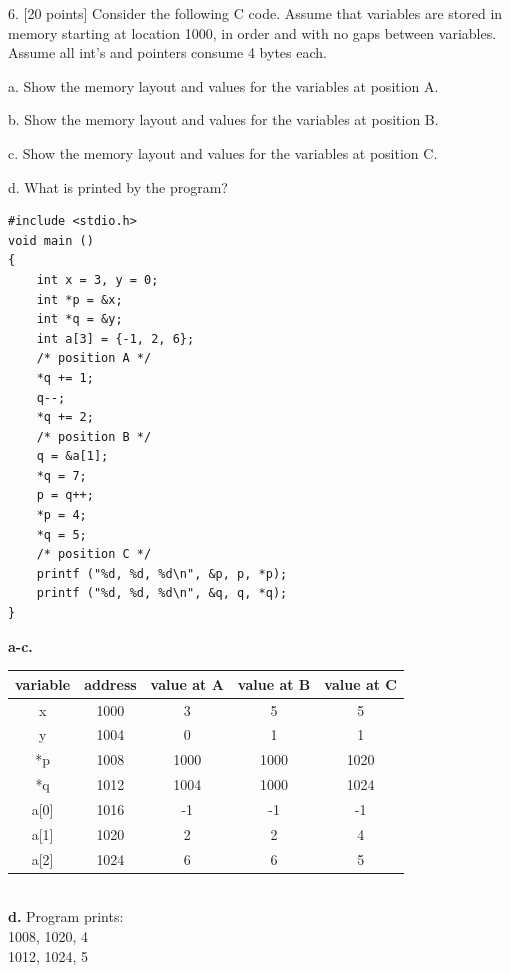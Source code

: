 \documentclass[12pt]{extarticle}
\begin{document}
\pagebreak

6. [20 points] Consider the following C code. Assume that variables are stored in memory starting at location 1000, in order and with no gaps between variables. Assume all int’s and pointers consume 4 bytes each.

a. Show the memory layout and values for the variables at position A.

b. Show the memory layout and values for the variables at position B.

c. Show the memory layout and values for the variables at position C.

d. What is printed by the program?
\begin{verbatim}
#include <stdio.h>
void main ()
{
    int x = 3, y = 0;
    int *p = &x;
    int *q = &y;
    int a[3] = {-1, 2, 6};
    /* position A */
    *q += 1;
    q--;
    *q += 2;
    /* position B */
    q = &a[1];
    *q = 7;
    p = q++;
    *p = 4;
    *q = 5;
    /* position C */
    printf ("%d, %d, %d\n", &p, p, *p);
    printf ("%d, %d, %d\n", &q, q, *q);
}

\end{verbatim}
\textbf{a-c. }\\
\begin{tabular}{|c|c|c|c|c|}
    \hline
     variable & address & value at A & value at B & value at C  \\
     \hline \hline
     x & 1000 & 3 & 5 & 5  \\
     y & 1004 & 0 & 1 & 1  \\
     *p & 1008 & 1000 & 1000 & 1020  \\
     *q & 1012 & 1004 & 1000 & 1024  \\
     a[0] & 1016 & -1 & -1 & -1  \\
     a[1] & 1020 & 2 & 2 & 4  \\
     a[2] & 1024 & 6 & 6 & 5  \\
     \hline
\end{tabular}\\
\textbf{d. }Program prints: \\
1008, 1020, 4\\
1012, 1024, 5
\end{document}

